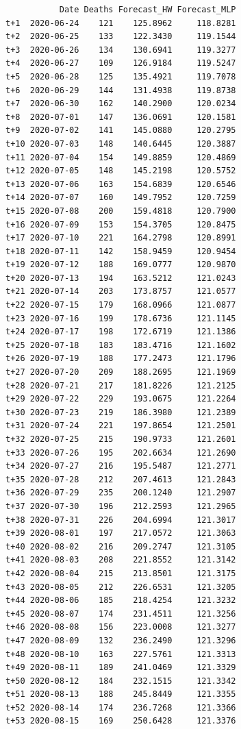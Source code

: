 \documentclass[
  us-letterpaper,
]{scrreprt}
\theoremstyle{plain}
\theoremstyle{definition}
\theoremstyle{plain}
\theoremstyle{definition}
\theoremstyle{remark}
\begin{document}
\begin{table}
{\begin{verbatim}
           Date Deaths Forecast_HW Forecast_MLP
t+1  2020-06-24    121    125.8962     118.8281
t+2  2020-06-25    133    122.3430     119.1544
t+3  2020-06-26    134    130.6941     119.3277
t+4  2020-06-27    109    126.9184     119.5247
t+5  2020-06-28    125    135.4921     119.7078
t+6  2020-06-29    144    131.4938     119.8738
t+7  2020-06-30    162    140.2900     120.0234
t+8  2020-07-01    147    136.0691     120.1581
t+9  2020-07-02    141    145.0880     120.2795
t+10 2020-07-03    148    140.6445     120.3887
t+11 2020-07-04    154    149.8859     120.4869
t+12 2020-07-05    148    145.2198     120.5752
t+13 2020-07-06    163    154.6839     120.6546
t+14 2020-07-07    160    149.7952     120.7259
t+15 2020-07-08    200    159.4818     120.7900
t+16 2020-07-09    153    154.3705     120.8475
t+17 2020-07-10    221    164.2798     120.8991
t+18 2020-07-11    142    158.9459     120.9454
t+19 2020-07-12    188    169.0777     120.9870
t+20 2020-07-13    194    163.5212     121.0243
t+21 2020-07-14    203    173.8757     121.0577
t+22 2020-07-15    179    168.0966     121.0877
t+23 2020-07-16    199    178.6736     121.1145
t+24 2020-07-17    198    172.6719     121.1386
t+25 2020-07-18    183    183.4716     121.1602
t+26 2020-07-19    188    177.2473     121.1796
t+27 2020-07-20    209    188.2695     121.1969
t+28 2020-07-21    217    181.8226     121.2125
t+29 2020-07-22    229    193.0675     121.2264
t+30 2020-07-23    219    186.3980     121.2389
t+31 2020-07-24    221    197.8654     121.2501
t+32 2020-07-25    215    190.9733     121.2601
t+33 2020-07-26    195    202.6634     121.2690
t+34 2020-07-27    216    195.5487     121.2771
t+35 2020-07-28    212    207.4613     121.2843
t+36 2020-07-29    235    200.1240     121.2907
t+37 2020-07-30    196    212.2593     121.2965
t+38 2020-07-31    226    204.6994     121.3017
t+39 2020-08-01    197    217.0572     121.3063
t+40 2020-08-02    216    209.2747     121.3105
t+41 2020-08-03    208    221.8552     121.3142
t+42 2020-08-04    215    213.8501     121.3175
t+43 2020-08-05    212    226.6531     121.3205
t+44 2020-08-06    185    218.4254     121.3232
t+45 2020-08-07    174    231.4511     121.3256
t+46 2020-08-08    156    223.0008     121.3277
t+47 2020-08-09    132    236.2490     121.3296
t+48 2020-08-10    163    227.5761     121.3313
t+49 2020-08-11    189    241.0469     121.3329
t+50 2020-08-12    184    232.1515     121.3342
t+51 2020-08-13    188    245.8449     121.3355
t+52 2020-08-14    174    236.7268     121.3366
t+53 2020-08-15    169    250.6428     121.3376
\end{verbatim}

}

\end{table}%
\end{document}
